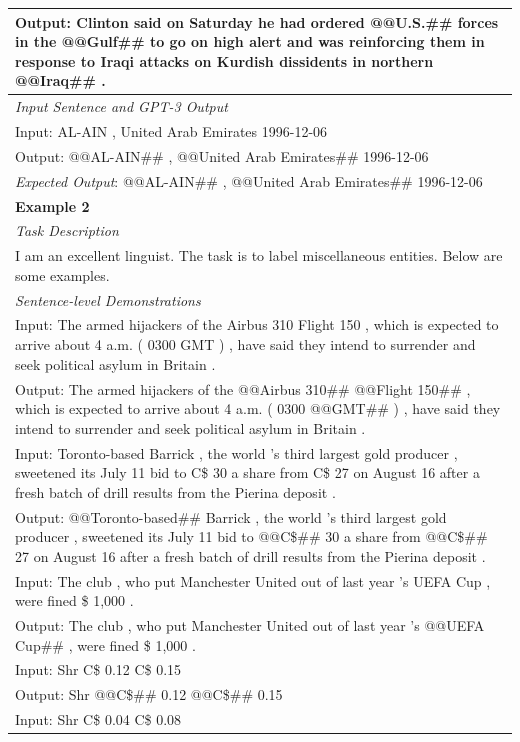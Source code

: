 \documentclass{article}
\begin{document}
\begin{table}[th!]
{\begin{tabular}{l}
Output: Clinton said on Saturday he had ordered @@U.S.\#\# forces in the @@Gulf\#\# to go on high alert and was reinforcing them in response to Iraqi attacks on Kurdish dissidents in northern @@Iraq\#\# . \\\midrule
\textit{Input Sentence and GPT-3 Output} \\
Input: AL-AIN , United Arab Emirates 1996-12-06 \\
Output: @@AL-AIN\#\# , @@United Arab Emirates\#\# 1996-12-06 \\
{\color{blue}\it Expected Output}: @@AL-AIN\#\# , @@United Arab Emirates\#\# 1996-12-06 \\\bottomrule

\textbf{Example 2} \\\midrule
       	\textit{Task Description} \\
I am an excellent linguist. The task is to label miscellaneous entities. Below are some examples. \\\midrule
\textit{Sentence-level Demonstrations} \\
Input: The armed hijackers of the Airbus 310 Flight 150 , which is expected to arrive about 4 a.m. ( 0300 GMT ) , have said they intend to surrender and seek political asylum in Britain . \\
Output: The armed hijackers of the @@Airbus 310\#\# @@Flight 150\#\# , which is expected to arrive about 4 a.m. ( 0300 @@GMT\#\# ) , have said they intend to surrender and seek political asylum in Britain . \\
Input: Toronto-based Barrick , the world 's third largest gold producer , sweetened its July 11 bid to C\$ 30 a share from C\$ 27 on August 16 after a fresh batch of drill results from the Pierina deposit . \\
Output: @@Toronto-based\#\# Barrick , the world 's third largest gold producer , sweetened its July 11 bid to @@C\$\#\# 30 a share from @@C\$\#\# 27 on August 16 after a fresh batch of drill results from the Pierina deposit . \\
Input: The club , who put Manchester United out of last year 's UEFA Cup , were fined \$ 1,000 . \\
Output: The club , who put Manchester United out of last year 's @@UEFA Cup\#\# , were fined \$ 1,000 . \\
Input: Shr C\$ 0.12 C\$ 0.15 \\
Output: Shr @@C\$\#\# 0.12 @@C\$\#\# 0.15 \\
Input: Shr C\$ 0.04 C\$ 0.08 \\

\end{tabular}}
\end{table}
\end{document}
